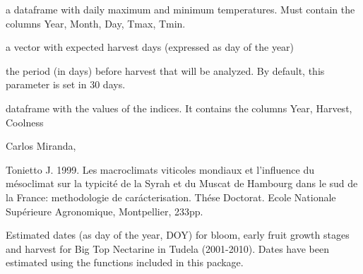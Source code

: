 \documentclass[a4paper]{book}
\begin{document}
%
\begin{Arguments}
\begin{ldescription}
\item[\code{climdata}] a dataframe with daily maximum and minimum temperatures.
Must contain the columns Year, Month, Day, Tmax, Tmin.

\item[\code{harvest}] a vector with expected harvest days
(expressed as day of the year)

\item[\code{span}] the period (in days) before harvest that will be analyzed. By 
default, this parameter is set in 30 days.
\end{ldescription}
\end{Arguments}
%
\begin{Value}
dataframe with the values of the indices. It contains the
columns Year, Harvest, Coolness
\end{Value}
%
\begin{Author}\relax
Carlos Miranda, 
\end{Author}
%
\begin{References}\relax
Tonietto J. 1999. Les macroclimats viticoles mondiaux et l'influence du
mésoclimat sur la typicité de la Syrah et du Muscat de Hambourg dans le
sud de la France: methodologie de carácterisation. Thése Doctorat. Ecole 
Nationale Supérieure Agronomique, Montpellier, 233pp.
\end{References}
%
\begin{Examples}
\end{Examples}
%
\begin{Description}\relax
Estimated dates (as day of the year, DOY) for bloom, early fruit growth stages 
and harvest for Big Top Nectarine in Tudela (2001-2010). Dates have been 
estimated using the functions included in this package.
\end{Description}
\end{document}
